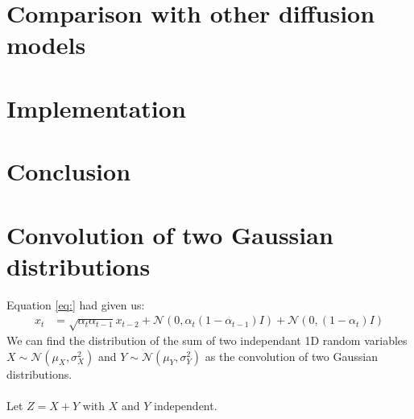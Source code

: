 \documentclass{article}
\begin{document}
\section{Comparison with other diffusion models}

\newpage
\section{Implementation}

\newpage
\section{Conclusion}

\newpage
\appendix
\section{Convolution of two Gaussian distributions}
Equation \ref{eq:} had given us:
\begin{align*}
  x_t &= \sqrt{\alpha_t \alpha_{t-1}} x_{t-2} + \mathcal{N}\left(0, \alpha_t\left(1 - \alpha_{t-1}\right)I \right) + \mathcal{N}\left(0, (1 - \alpha_t) I \right)
\end{align*}
We can find the distribution of the sum of two independant 1D random variables $X \sim \mathcal{N}\left(\mu_X, \sigma_X^2\right)$ and $Y \sim \mathcal{N}\left(\mu_Y, \sigma_Y^2\right)$ as the convolution of two Gaussian distributions.
\\\\
Let $Z = X + Y$ with $X$ and $Y$ independent.
\end{document}
